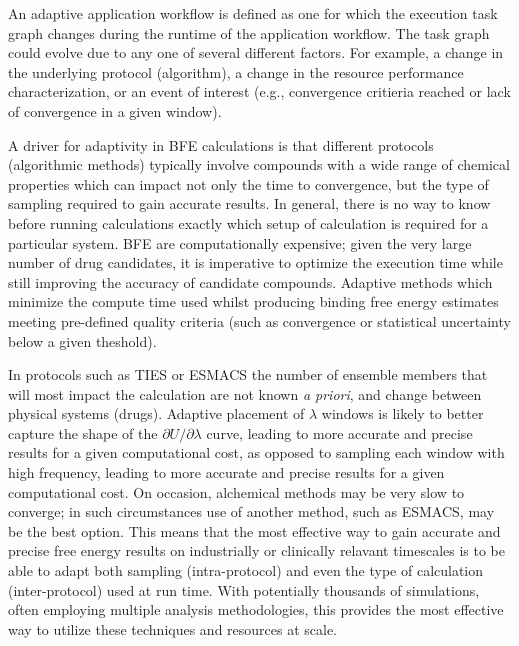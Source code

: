 \documentclass[11pt]{article}
\begin{document}
 An adaptive application
workflow is defined as one for which the execution task graph changes during
the runtime of the application workflow. The task graph could evolve due to
any one of several different factors. For example, a change in the underlying
protocol (algorithm), a change in the resource performance characterization,
or an event of interest (e.g., convergence critieria reached or lack of
convergence in a given window).

A driver for adaptivity in BFE calculations is that different protocols
(algorithmic methods) typically involve compounds with a wide range of
chemical properties which can impact not only the time to convergence, but the
type of sampling required to gain accurate results. In general, there is no
way to know before running calculations exactly which setup of calculation is
required for a particular system. BFE are computationally expensive; given the
very large number of drug candidates, it is imperative to optimize the
execution time while still improving the accuracy of candidate compounds.
Adaptive methods which minimize the compute time used whilst producing binding
free energy estimates meeting pre-defined quality criteria (such as
convergence or statistical uncertainty below a given theshold).

  
In protocols such as TIES or ESMACS the number of ensemble members that will
most impact the calculation are not known \textit{a priori}, and change
between physical systems (drugs). Adaptive placement of $\lambda$ windows is
likely to better capture the shape of the $\partial U/\partial\lambda$ curve,
leading to more accurate and precise results for a given computational cost,
as opposed to sampling each window with high frequency, leading to more
accurate and precise results for a given computational cost. On occasion,
alchemical methods may be very slow to converge; in such circumstances use of
another method, such as ESMACS, may be the best option. This means that the
most effective way to gain accurate and precise free energy results on
industrially or clinically relavant timescales is to be able to adapt both
sampling (intra-protocol) and even the type of calculation (inter-protocol)
used at run time. With potentially thousands of simulations, often employing
multiple analysis methodologies, this provides the most effective way to
utilize these techniques and resources at scale.
\end{document}
